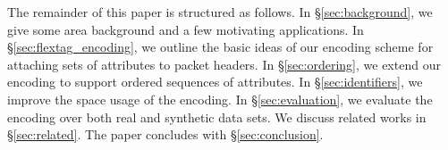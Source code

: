 
The remainder of this paper is structured as follows. In \S \ref{sec:background}, we give some area background and a few motivating applications. In \S \ref{sec:flextag_encoding}, we outline the basic ideas of our encoding scheme for attaching sets of attributes to packet headers. In \S \ref{sec:ordering}, we extend our encoding to support ordered sequences of attributes. In \S \ref{sec:identifiers}, we improve the space usage of the encoding. In \S \ref{sec:evaluation}, we evaluate the encoding over both real and synthetic data sets. We discuss related works in \S \ref{sec:related}. The paper concludes with \S \ref{sec:conclusion}.






%

